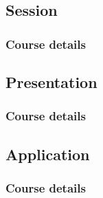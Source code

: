 \subsection{Session}
  \begin{frame}
    \frametitle{Course details}
  \end{frame}
\subsection{Presentation}
  \begin{frame}
    \frametitle{Course details}
  \end{frame}
\subsection{Application}
  \begin{frame}
    \frametitle{Course details}
  \end{frame}
